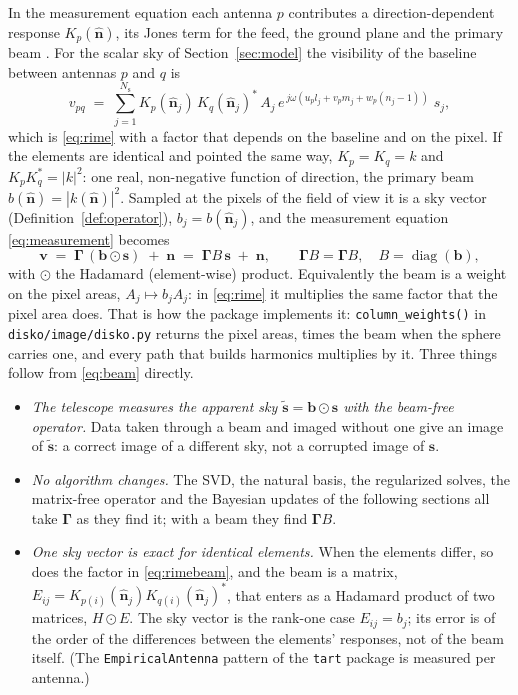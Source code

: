 \documentclass[11pt,a4paper]{article}
\newcommand{\Ns}{N_{\mathrm{s}}}
\newcommand{\Gammam}{\boldsymbol{\Gamma}}
\newcommand{\svec}{\boldsymbol{s}}
\newcommand{\vvec}{\boldsymbol{v}}
\newcommand{\bvec}{\boldsymbol{b}}
\newcommand{\Gammab}{\Gammam B}
\begin{document}
In the measurement equation each antenna $p$ contributes a direction-dependent
response $K_p(\hat{\boldsymbol{n}})$, its Jones term for the feed, the ground
plane and the primary beam \cite{hamaker1996,smirnov2011}. For the scalar sky
of Section~\ref{sec:model} the visibility of the baseline between antennas
$p$ and $q$ is
\begin{equation}
  \label{eq:rimebeam}
  v_{pq} \;=\; \sum_{j=1}^{\Ns} K_p(\hat{\boldsymbol{n}}_j)\,
    K_q(\hat{\boldsymbol{n}}_j)^{*}\,A_j\,
    e^{\,j\omega(u_p l_j+v_p m_j+w_p(n_j-1))}\;s_j ,
\end{equation}
which is \eqref{eq:rime} with a factor that depends on the baseline and on
the pixel. If the elements are identical and pointed the same way,
$K_p=K_q=k$ and $K_pK_q^{*}=|k|^{2}$: one real, non-negative function of
direction, the primary beam
$b(\hat{\boldsymbol{n}})=|k(\hat{\boldsymbol{n}})|^{2}$.
Sampled at the pixels of the field of view it is a sky vector
(Definition~\ref{def:operator}), $b_j=b(\hat{\boldsymbol{n}}_j)$, and the
measurement equation \eqref{eq:measurement} becomes
\begin{equation}
  \label{eq:beam}
  \vvec \;=\; \Gammam\,(\bvec\odot\svec) \;+\; \boldsymbol{n}
  \;=\; \Gammab\,\svec \;+\; \boldsymbol{n},
  \qquad \Gammab=\Gammam B,\quad
  B=\operatorname{diag}(\bvec),
\end{equation}
with $\odot$ the Hadamard (element-wise) product. Equivalently the beam is a
weight on the pixel areas, $A_j\mapsto b_jA_j$: in \eqref{eq:rime} it
multiplies the same factor that the pixel area does. That is how the package
implements it: \texttt{column\_weights()} in \texttt{disko/image/disko.py}
returns the pixel areas, times the beam when the sphere carries one, and
every path that builds harmonics multiplies by it. Three things follow
from \eqref{eq:beam} directly.

\begin{itemize}
\item \emph{The telescope measures the apparent sky
  $\tilde{\svec}=\bvec\odot\svec$ with the beam-free operator.} Data taken
  through a beam and imaged without one give an image of $\tilde{\svec}$: a
  correct image of a different sky, not a corrupted image of $\svec$.
\item \emph{No algorithm changes.} The SVD, the natural basis, the
  regularized solves, the matrix-free operator and the Bayesian updates of
  the following sections all take $\Gammam$ as they find it; with a beam they
  find $\Gammab$.
\item \emph{One sky vector is exact for identical elements.} When the
  elements differ, so does the factor in \eqref{eq:rimebeam}, and the beam is
  a matrix, $E_{ij}=K_{p(i)}(\hat{\boldsymbol{n}}_j)K_{q(i)}(\hat{\boldsymbol{n}}_j)^{*}$,
  that enters as a Hadamard product of two matrices, $H\odot E$. The sky
  vector is the rank-one case $E_{ij}=b_j$; its error is of the order of the
  differences between the elements' responses, not of the beam itself. (The
  \texttt{EmpiricalAntenna} pattern of the \texttt{tart} package is measured
  per antenna.)
\end{itemize}
\end{document}
